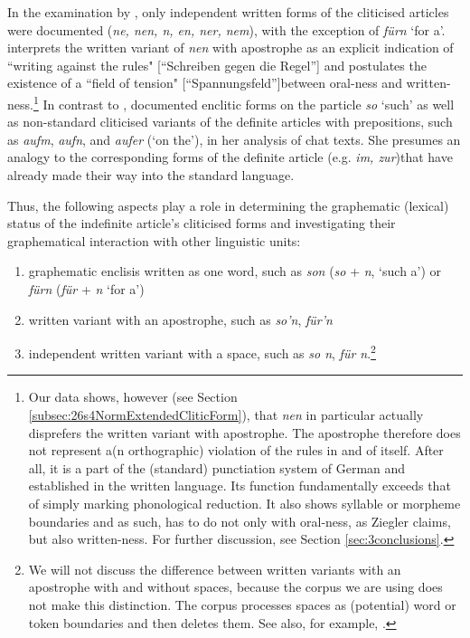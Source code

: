 In the examination by \citet[173]{Tophinke2002}, only independent written forms of the cliticised articles were documented (\textit{ne, nen, n, en, ner, nem}), with the exception of \textit{fürn} `for a'.
\citet[312]{Ziegler2011} interprets the written variant of \textit{nen} with apostrophe as an explicit indication of ``writing against the rules" [``Schreiben gegen die Regel''] and postulates the existence of a ``field of tension" [``Spannungsfeld'']between oral-ness and written-ness.\footnote{
	Our data shows, however (see Section \ref{subsec:26s4NormExtendedCliticForm}), that \textit{nen} in particular actually disprefers the written variant with apostrophe.
	The apostrophe therefore does not represent a(n orthographic) violation of the rules in and of itself.
	After all, it is a part of the (standard) punctiation system of German and established in the written language.
	Its function fundamentally exceeds that of simply marking phonological reduction.
	It also shows syllable or morpheme boundaries and as such, has to do not only with oral-ness, as Ziegler claims, but also written-ness.
	For further discussion, see Section \ref{sec:3conclusions}.}
In contrast to \citet{Prinz1991}, \citet[7]{Burri2003} documented enclitic forms on the particle \textit{so} `such' as well as non-standard cliticised variants of the definite articles with prepositions, such as \textit{aufm}, \textit{aufn}, and \textit{aufer} (`on the'), in her analysis of chat texts.
She presumes an analogy to the corresponding forms of the definite article (e.g. \textit{im, zur})that have already made their way into the standard language.

Thus, the following aspects play a role in determining the graphematic (lexical) status of the indefinite article's cliticised forms and investigating their graphematical interaction with other linguistic units:
\begin{enumerate}
	\item graphematic enclisis written as one word, such as \textit{son} (\textit{so} + \textit{n}, `such a') or \textit{fürn} (\textit{für} + \textit{n} `for a')
	\item written variant with an apostrophe, such as \textit{so'n}, \textit{für'n}
	\item independent written variant with a space, such as \textit{so n}, \textit{für n}.\footnote{
		We will not discuss the difference between written variants with an apostrophe with and without spaces, because the corpus we are using does not make this distinction.
		The corpus processes spaces as (potential) word or token boundaries and then deletes them.
		See also, for example, \citet[Ch. 4]{SchaeferBildhauer2013}.}
\end{enumerate}

